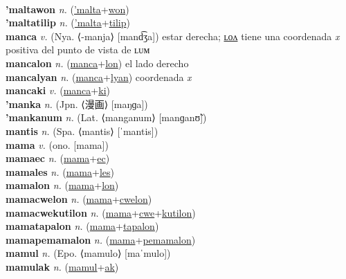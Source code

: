  \label{'maltaak} \\
\textbf{'maltawon} \textit{n.} (\hyperref['malta]{'malta}+\hyperref[won]{won})
 \label{'maltawon} \\
\textbf{'maltatilip} \textit{n.} (\hyperref['malta]{'malta}+\hyperref[tilip]{tilip})
 \label{'maltatilip} \\
\textbf{manca} \textit{v.} (Nya. ⟨-manja⟩ [mand͡ʒa])
estar derecha; \hyperref[mancalon]{ʟᴏᴧ} tiene una coordenada \textit{x} positiva del punto de vista de ʟᴜᴍ \label{manca} \\
\textbf{mancalon} \textit{n.} (\hyperref[manca]{manca}+\hyperref[lon]{lon})
el lado derecho \label{mancalon} \\
\textbf{mancalyan} \textit{n.} (\hyperref[manca]{manca}+\hyperref[lyan]{lyan})
coordenada \textit{x} \label{mancalyan} \\
\textbf{mancaki} \textit{v.} (\hyperref[manca]{manca}+\hyperref[ki]{ki})
 \label{mancaki} \\
\textbf{'manka} \textit{n.} (Jpn. ⟨漫画⟩ [maŋɡa])
 \label{'manka} \\
\textbf{'mankanum} \textit{n.} (Lat. ⟨manganum⟩ [manɡanʊ̃])
 \label{'mankanum} \\
\textbf{mantis} \textit{n.} (Spa. ⟨mantis⟩ [ˈmantis])
 \label{mantis} \\
\textbf{mama} \textit{v.} (ono. [mama])
 \label{mama} \\
\textbf{mamaec} \textit{n.} (\hyperref[mama]{mama}+\hyperref[ec]{ec})
 \label{mamaec} \\
\textbf{mamales} \textit{n.} (\hyperref[mama]{mama}+\hyperref[les]{les})
 \label{mamales} \\
\textbf{mamalon} \textit{n.} (\hyperref[mama]{mama}+\hyperref[lon]{lon})
 \label{mamalon} \\
\textbf{mamacwelon} \textit{n.} (\hyperref[mama]{mama}+\hyperref[cwelon]{cwelon})
 \label{mamacwelon} \\
\textbf{mamacwekutilon} \textit{n.} (\hyperref[mama]{mama}+\hyperref[cwe]{cwe}+\hyperref[kutilon]{kutilon})
 \label{mamacwekutilon} \\
\textbf{mamatapalon} \textit{n.} (\hyperref[mama]{mama}+\hyperref[tapalon]{tapalon})
 \label{mamatapalon} \\
\textbf{mamapemamalon} \textit{n.} (\hyperref[mama]{mama}+\hyperref[pemamalon]{pemamalon})
 \label{mamapemamalon} \\
\textbf{mamul} \textit{n.} (Epo. ⟨mamulo⟩ [maˈmulo])
 \label{mamul} \\
\textbf{mamulak} \textit{n.} (\hyperref[mamul]{mamul}+\hyperref[ak]{ak})
